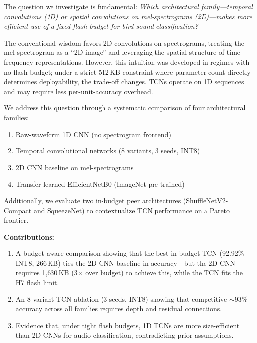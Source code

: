 \documentclass[conference]{IEEEtran}
\begin{document}
The question we investigate is fundamental: \textit{Which architectural family---temporal convolutions (1D) or spatial convolutions on mel-spectrograms (2D)---makes more efficient use of a fixed flash budget for bird sound classification?}

The conventional wisdom favors 2D convolutions on spectrograms, treating the mel-spectrogram as a ``2D image'' and leveraging the spatial structure of time--frequency representations. However, this intuition was developed in regimes with no flash budget; under a strict 512\,KB constraint where parameter count directly determines deployability, the trade-off changes. TCNs operate on 1D sequences and may require less per-unit-accuracy overhead.

We address this question through a systematic comparison of four architectural families:
\begin{enumerate}
  \item Raw-waveform 1D CNN (no spectrogram frontend)
  \item Temporal convolutional networks (8 variants, 3 seeds, INT8)
  \item 2D CNN baseline on mel-spectrograms
  \item Transfer-learned EfficientNetB0 (ImageNet pre-trained)
\end{enumerate}

Additionally, we evaluate two in-budget peer architectures (ShuffleNetV2-Compact and SqueezeNet) to contextualize TCN performance on a Pareto frontier.

\textbf{Contributions:}
\begin{enumerate}
  \item A budget-aware comparison showing that the best in-budget TCN (92.92\% INT8, 266\,KB) ties the 2D CNN baseline in accuracy---but the 2D CNN requires 1{,}630\,KB (3$\times$ over budget) to achieve this, while the TCN fits the H7 flash limit.
  \item An 8-variant TCN ablation (3 seeds, INT8) showing that competitive $\sim$93\% accuracy across all families requires depth and residual connections.
  \item Evidence that, under tight flash budgets, 1D TCNs are more size-efficient than 2D CNNs for audio classification, contradicting prior assumptions.
\end{enumerate}

\end{document}
